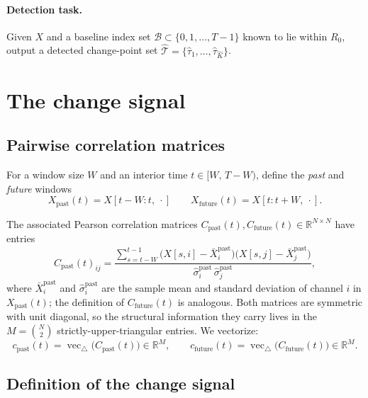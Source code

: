 \documentclass[11pt,a4paper]{article}
\newcommand{\vectri}{\operatorname{vec}_{\triangle}}
\newcommand{\R}{\mathbb{R}}
\begin{document}
\paragraph{Detection task.}
Given $X$ and a baseline index set $\mathcal{B} \subset \{0, 1, \ldots, T-1\}$
known to lie within $R_0$, output a detected change-point set
$\widehat{\mathcal{T}} = \{\hat\tau_1, \ldots, \hat\tau_{\hat K}\}$.

\section{The change signal}

\subsection{Pairwise correlation matrices}

For a window size $W$ and an interior time $t \in [W,\, T - W)$, define the
\emph{past} and \emph{future} windows
\begin{equation}
X_{\text{past}}(t) = X[t - W : t,\ \cdot]
\qquad
X_{\text{future}}(t) = X[t : t + W,\ \cdot].
\end{equation}

The associated Pearson correlation matrices
$C_{\text{past}}(t), C_{\text{future}}(t) \in \R^{N \times N}$
have entries
\begin{equation}
C_{\text{past}}(t)_{ij}
= \frac{\sum_{s = t - W}^{t - 1}\!\big(X[s,i] - \bar X_i^{\text{past}}\big)\big(X[s,j] - \bar X_j^{\text{past}}\big)}
{\,\hat\sigma_i^{\text{past}}\, \hat\sigma_j^{\text{past}}\,},
\end{equation}
where $\bar X_i^{\text{past}}$ and $\hat\sigma_i^{\text{past}}$ are the sample
mean and standard deviation of channel $i$ in $X_{\text{past}}(t)$; the
definition of $C_{\text{future}}(t)$ is analogous. Both matrices are
symmetric with unit diagonal, so the structural information they carry
lives in the $M = \binom{N}{2}$ strictly-upper-triangular entries. We
vectorize:
\begin{equation}
c_{\text{past}}(t) = \vectri\!\big(C_{\text{past}}(t)\big) \in \R^{M},
\qquad
c_{\text{future}}(t) = \vectri\!\big(C_{\text{future}}(t)\big) \in \R^{M}.
\end{equation}

\subsection{Definition of the change signal}
\end{document}

